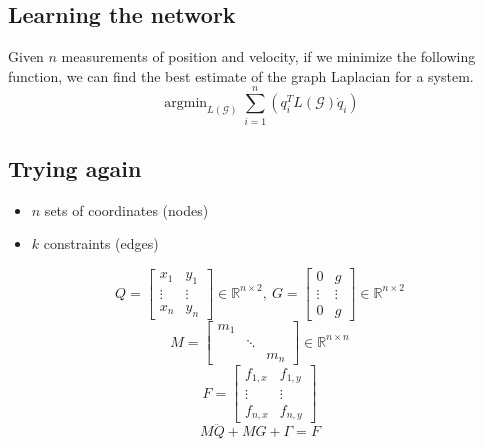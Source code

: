 \documentclass[conference]{IEEEtran}
\DeclareMathOperator*{\argmin}{argmin}
\begin{document}
\subsection{Learning the network}
Given $n$ measurements of position and velocity, if we minimize the following function, we can find the best estimate of the graph Laplacian for a system.
$$\argmin_{L(\mathcal{G})}\sum_{i=1}^n(q_i^TL(\mathcal{G})\dot{q}_i)$$

\subsection{Trying again}
\begin{itemize}
    \item $n$ sets of coordinates (nodes)
    \item $k$ constraints (edges)
\end{itemize}

$$Q=\begin{bmatrix}
    x_1 & y_1\\
    \vdots & \vdots\\
    x_n & y_n
\end{bmatrix}\in\mathbb{R}^{n\times2},\:
G=\begin{bmatrix}
    0 & g\\
    \vdots & \vdots\\
    0 & g
\end{bmatrix}\in\mathbb{R}^{n\times2}$$
$$M=\begin{bmatrix}
    m_1\\
    & \ddots\\
    & & m_n
\end{bmatrix}\in\mathbb{R}^{n\times n}$$
$$F=\begin{bmatrix}
    f_{1,x} & f_{1,y}\\
    \vdots & \vdots\\
    f_{n,x} & f_{n,y}
\end{bmatrix}$$
$$M\ddot{Q}+MG+\Gamma=F$$
\end{document}
